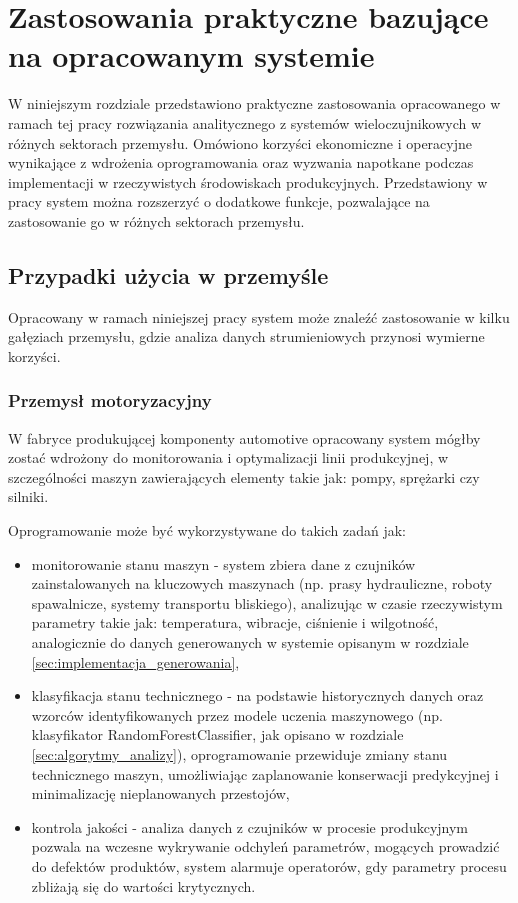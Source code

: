 \section{Zastosowania praktyczne bazujące na opracowanym systemie}
\label{sec:zastosowania_praktyczne}

W niniejszym rozdziale przedstawiono praktyczne zastosowania opracowanego w ramach tej pracy rozwiązania analitycznego z
systemów wieloczujnikowych w różnych sektorach przemysłu. Omówiono korzyści ekonomiczne i operacyjne wynikające z wdrożenia oprogramowania
oraz wyzwania napotkane podczas implementacji w rzeczywistych środowiskach produkcyjnych. Przedstawiony w pracy system można rozszerzyć o dodatkowe funkcje, pozwalające na zastosowanie go w różnych sektorach przemysłu.

\subsection{Przypadki użycia w przemyśle}
\label{subsec:przypadki_uzycia}

Opracowany w ramach niniejszej pracy system może znaleźć zastosowanie w kilku gałęziach przemysłu, gdzie analiza danych strumieniowych przynosi wymierne korzyści.

\subsubsection{Przemysł motoryzacyjny}
\label{subsubsec:przemysl_motoryzacyjny}

W fabryce produkującej komponenty automotive opracowany system mógłby zostać wdrożony do monitorowania i optymalizacji linii produkcyjnej, w szczególności maszyn zawierających elementy takie jak: pompy, sprężarki czy silniki. 

\vspace{0.3em}

Oprogramowanie może być wykorzystywane do takich zadań jak:

\begin{itemize}
    \item monitorowanie stanu maszyn - system zbiera dane z czujników zainstalowanych na kluczowych maszynach (np. prasy hydrauliczne, roboty spawalnicze, systemy transportu bliskiego),
    analizując w czasie rzeczywistym parametry takie jak: temperatura, wibracje, ciśnienie i wilgotność, analogicznie do danych generowanych w systemie opisanym w rozdziale \ref{sec:implementacja_generowania},
    \item klasyfikacja stanu technicznego - na podstawie historycznych danych oraz wzorców identyfikowanych przez modele uczenia maszynowego (np. klasyfikator RandomForestClassifier, jak opisano w rozdziale \ref{sec:algorytmy_analizy}), oprogramowanie przewiduje zmiany stanu technicznego maszyn,
    umożliwiając zaplanowanie konserwacji predykcyjnej i minimalizację nieplanowanych przestojów,
    \item kontrola jakości - analiza danych z czujników w procesie produkcyjnym pozwala na wczesne wykrywanie odchyleń parametrów, mogących prowadzić do defektów
    produktów, system alarmuje operatorów, gdy parametry procesu zbliżają się do wartości krytycznych.
\end{itemize}

